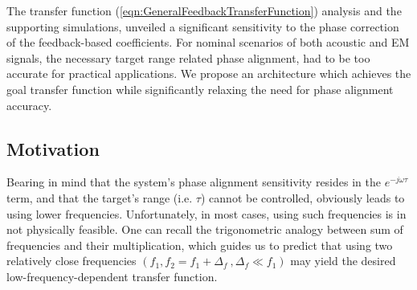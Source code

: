 The transfer function (\ref{eqn:GeneralFeedbackTransferFunction}) analysis and the supporting simulations, unveiled a significant sensitivity to the phase correction of the feedback-based coefficients. For nominal scenarios of both acoustic and EM signals, the necessary target range related phase alignment, had to be too accurate for practical applications. We propose an architecture which achieves the goal transfer function while significantly relaxing the need for phase alignment accuracy.
\subsection*{Motivation}
Bearing in mind that the system's phase alignment sensitivity resides in the $e^{-j\omega\tau}$ term, and that the target's range (i.e. $\tau$) cannot be controlled, obviously leads to using lower frequencies. Unfortunately, in most cases, using such frequencies is in not physically feasible. One can recall the trigonometric analogy between sum of frequencies and their multiplication, which guides us to predict that using two relatively close frequencies $\left(f_{1},f_{2}=f_{1}+\Delta_{f} \ , \Delta_{f} \ll f_{1}\right)$ may yield the desired low-frequency-dependent transfer function.
